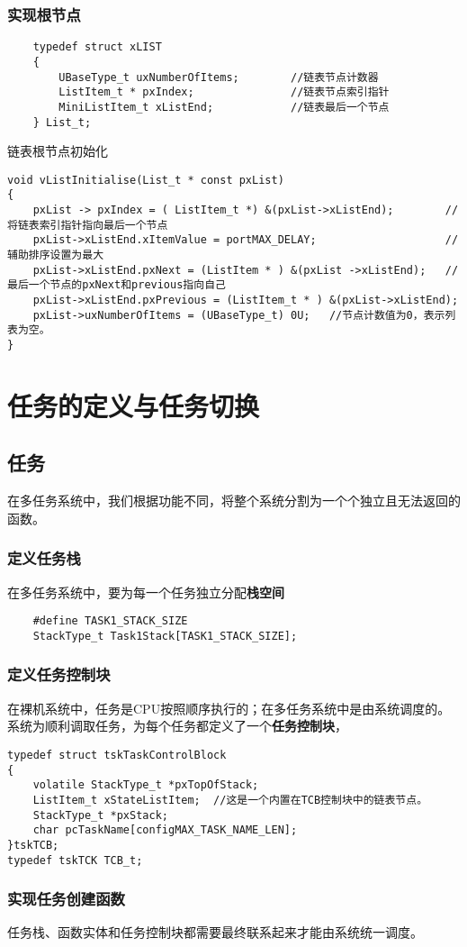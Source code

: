 \documentclass[11pt,a4paper]{ctexart}
\begin{document}
\subsubsection{实现根节点}
\begin{lstlisting}
	typedef struct xLIST
	{
		UBaseType_t uxNumberOfItems;        //链表节点计数器
		ListItem_t * pxIndex;               //链表节点索引指针
		MiniListItem_t xListEnd;            //链表最后一个节点
	} List_t;
\end{lstlisting}

链表根节点初始化
\begin{lstlisting}
void vListInitialise(List_t * const pxList)
{
	pxList -> pxIndex = ( ListItem_t *) &(pxList->xListEnd);        //将链表索引指针指向最后一个节点
	pxList->xListEnd.xItemValue = portMAX_DELAY;                    //辅助排序设置为最大
	pxList->xListEnd.pxNext = (ListItem * ) &(pxList ->xListEnd);   //最后一个节点的pxNext和previous指向自己
	pxList->xListEnd.pxPrevious = (ListItem_t * ) &(pxList->xListEnd);
	pxList->uxNumberOfItems = (UBaseType_t) 0U;   //节点计数值为0，表示列表为空。
}
\end{lstlisting}

\section{任务的定义与任务切换}
\subsection{任务}
在多任务系统中，我们根据功能不同，将整个系统分割为一个个独立且无法返回的函数。
\subsubsection{定义任务栈}
在多任务系统中，要为每一个任务独立分配\textbf{栈空间}
\begin{lstlisting}
	#define TASK1_STACK_SIZE
	StackType_t Task1Stack[TASK1_STACK_SIZE];
\end{lstlisting}
\subsubsection{定义任务控制块}
在裸机系统中，任务是CPU按照顺序执行的；在多任务系统中是由系统调度的。系统为顺利调取任务，为每个任务都定义了一个\textbf{任务控制块}，
\begin{lstlisting}
typedef struct tskTaskControlBlock
{
	volatile StackType_t *pxTopOfStack;
	ListItem_t xStateListItem;  //这是一个内置在TCB控制块中的链表节点。
	StackType_t *pxStack;
	char pcTaskName[configMAX_TASK_NAME_LEN];
}tskTCB;
typedef tskTCK TCB_t;
\end{lstlisting}
\subsubsection{实现任务创建函数}
任务栈、函数实体和任务控制块都需要最终联系起来才能由系统统一调度。
\end{document}
